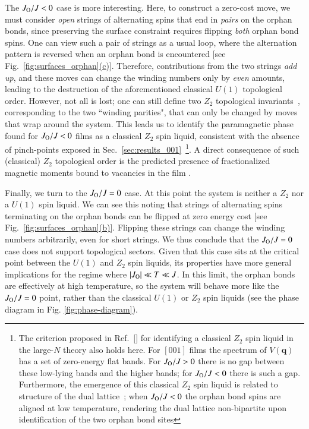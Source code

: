 \documentclass[aps,prx,reprint,runinaddress,superscriptaddress,amsmath,amssymb,floatfix,longbibliography]{revtex4-1}
\renewcommand{\vec}[1]{\boldsymbol{#1}}
\newcommand{\Jo}{J_{\rm O}}
\newcommand{\subref}[2]{\ref{#1}\hyperref[#1]{#2}}
\begin{document}
The $\Jo/J < 0$ case is more interesting. Here, to construct a zero-cost move, we must consider \emph{open} strings of alternating spins that end in \emph{pairs} on the orphan bonds, since preserving the surface constraint requires flipping \emph{both} orphan bond spins. One can view such a pair of strings as a usual loop, where the alternation pattern is reversed when an orphan bond is encountered [see Fig.~\subref{fig:surfaces_orphan}{(c)}]. Therefore, contributions from the two strings \emph{add up}, and these moves can change the winding numbers only by \emph{even} amounts, leading to the destruction of the aforementioned classical $U(1)$ topological order. However, not all is lost; one can still define two $Z_2$ topological invariants~\cite{Rehn2017}, corresponding to the two ``winding parities", that can only be changed by moves that wrap around the system. This leads us to identify the paramagnetic phase found for $\Jo/J<0$ films as a classical $Z_2$ spin liquid, consistent with the absence of pinch-points exposed in Sec.~\ref{sec:results_001}~\footnote{The criterion proposed in Ref.~[] for identifying a classical $Z_2$ spin liquid in the large-$N$ theory also holds here. For $[001]$ films the spectrum of $V(\vec{q})$ has a set of zero-energy flat bands. For $\Jo/J>0$ there is no gap between these low-lying bands and the higher bands; for $\Jo/J<0$ there is such a gap. Furthermore, the emergence of this classical $Z_2$ spin liquid is related to structure of the dual lattice~\cite{Rehn2017}; when $\Jo/J<0$ the orphan bond spins are aligned at low temperature, rendering the dual lattice non-bipartite upon identification of the two orphan bond sites}. A direct consequence of such (classical) $Z_2$ topological order is the predicted presence of fractionalized magnetic moments bound to vacancies in the film \cite{Rehn2017}. 

Finally, we turn to the $\Jo/J = 0$ case. At this point the system is neither a $Z_2$ nor a $U(1)$ spin liquid. We can see this noting that strings of alternating spins terminating on the orphan bonds can be flipped at zero energy cost [see Fig.~\subref{fig:surfaces_orphan}{(b)}]. Flipping these strings can change the winding numbers arbitrarily, even for short strings. We thus conclude that the $\Jo/J=0$ case does not support topological sectors. Given that this case sits at the critical point between the $U(1)$ and $Z_2$ spin liquids, its properties have more general implications for the regime where $|\Jo| \ll T \ll J$. In this limit, the orphan bonds are effectively at high temperature, so the system will behave more like the $\Jo/J=0$ point, rather than the classical $U(1)$ or $Z_2$ spin liquids (see the phase diagram in Fig. \ref{fig:phase-diagram}). 
\end{document}
